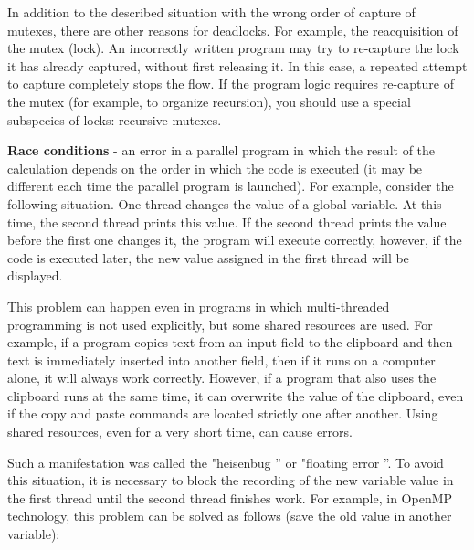 {	\par In addition to the described situation with the wrong order of capture of mutexes, there are other reasons for deadlocks. For example, the reacquisition of the mutex (lock). An incorrectly written program may try to re-capture the lock it has already captured, without first releasing it. In this case, a repeated attempt to capture completely stops the flow. If the program logic requires re-capture of the mutex (for example, to organize recursion), you should use a special subspecies of locks: recursive mutexes.
	\par\textbf{Race conditions} - an error in a parallel program in which the result of the calculation depends on the order in which the code is executed (it may be different each time the parallel program is launched). For example, consider the following situation. One thread changes the value of a global variable. At this time, the second thread prints this value. If the second thread prints the value before the first one changes it, the program will execute correctly, however, if the code is executed later, the new value assigned in the first thread will be displayed.
	\begin{figure}[H]
		
	\end{figure}
	\par This problem can happen even in programs in which multi-threaded programming is not used explicitly, but some shared resources are used. For example, if a program copies text from an input field to the clipboard and then text is immediately inserted into another field, then if it runs on a computer alone, it will always work correctly. However, if a program that also uses the clipboard runs at the same time, it can overwrite the value of the clipboard, even if the copy and paste commands are located strictly one after another. Using shared resources, even for a very short time, can cause errors.
	\par Such a manifestation was called the "heisenbug '' or "floating error ''. To avoid this situation, it is necessary to block the recording of the new variable value in the first thread until the second thread finishes work. For example, in OpenMP technology, this problem can be solved as follows (save the old value in another variable):
	\begin{figure}[H]
		
	\end{figure}
}
